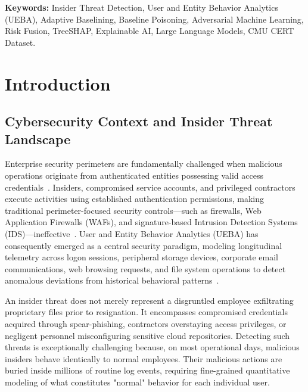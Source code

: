 \documentclass[12pt,a4paper]{report}
\begin{document}
\vspace{0.5cm}
\noindent\textbf{Keywords:} Insider Threat Detection, User and Entity Behavior Analytics (UEBA), Adaptive Baselining, Baseline Poisoning, Adversarial Machine Learning, Risk Fusion, TreeSHAP, Explainable AI, Large Language Models, CMU CERT Dataset.

\newpage
\tableofcontents
\newpage
\listoffigures
\newpage
\listoftables

\newpage
{}
\setcounter{page}{1}

\chapter{Introduction}
\label{chap:introduction}

\section{Cybersecurity Context and Insider Threat Landscape}
Enterprise security perimeters are fundamentally challenged when malicious operations originate from authenticated entities possessing valid access credentials~\cite{alzaabi2024review}. Insiders, compromised service accounts, and privileged contractors execute activities using established authentication permissions, making traditional perimeter-focused security controls---such as firewalls, Web Application Firewalls (WAFs), and signature-based Intrusion Detection Systems (IDS)---ineffective~\cite{chinthala2026adversarial}. User and Entity Behavior Analytics (UEBA) has consequently emerged as a central security paradigm, modeling longitudinal telemetry across logon sessions, peripheral storage devices, corporate email communications, web browsing requests, and file system operations to detect anomalous deviations from historical behavioral patterns~\cite{glasser2013cert}.

An insider threat does not merely represent a disgruntled employee exfiltrating proprietary files prior to resignation. It encompasses compromised credentials acquired through spear-phishing, contractors overstaying access privileges, or negligent personnel misconfiguring sensitive cloud repositories. Detecting such threats is exceptionally challenging because, on most operational days, malicious insiders behave identically to normal employees. Their malicious actions are buried inside millions of routine log events, requiring fine-grained quantitative modeling of what constitutes "normal" behavior for each individual user.
\end{document}
